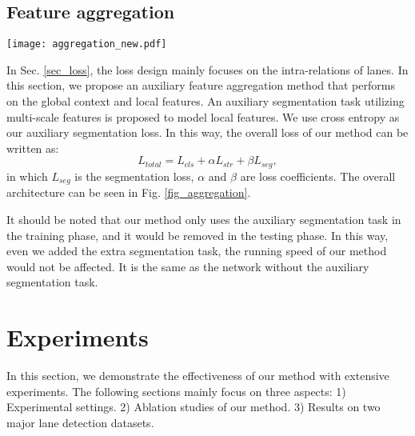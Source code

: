 \documentclass[runningheads]{llncs}
\begin{document}
\subsection{Feature aggregation}
\begin{figure*}[t]
	\centering
	\texttt{[image: aggregation\_new.pdf]}
	\caption{Overall architecture. The auxiliary branch is shown in the upper part, which is only valid when training. The feature extractor is shown in the blue box. The classification-based prediction and auxiliary segmentation task are illustrated in the green and orange boxes, respectively. The group classification is conducted on each row anchor.}
	\label{fig_aggregation}
	\vspace{-10pt}
\end{figure*}

In Sec. \ref{sec_loss}, the loss design mainly focuses on the intra-relations of lanes. In this section, we propose an auxiliary feature aggregation method that performs on the global context and local features. An auxiliary segmentation task utilizing multi-scale features is proposed to model local features. We use cross entropy as our auxiliary segmentation loss. In this way, the overall loss of our method can be written as:
\begin{equation}
L_{total} = L_{cls} + \alpha L_{str} + \beta L_{seg},
\label{eq_total}
\end{equation}
in which $L_{seg}$ is the segmentation loss, $\alpha$ and $\beta$ are loss coefficients.
The overall architecture can be seen in Fig. \ref{fig_aggregation}. 



It should be noted that our method only uses the auxiliary segmentation task in the training phase, and it would be removed in the testing phase. In this way, even we added the extra segmentation task, the running speed of our method would not be affected. It is the same as the network without the auxiliary segmentation task.



\section{Experiments}

In this section, we demonstrate the effectiveness of our method with extensive experiments. The following sections mainly focus on three aspects: 1) Experimental settings. 2) Ablation studies of our method. 3) Results on two major lane detection datasets. 
\end{document}

